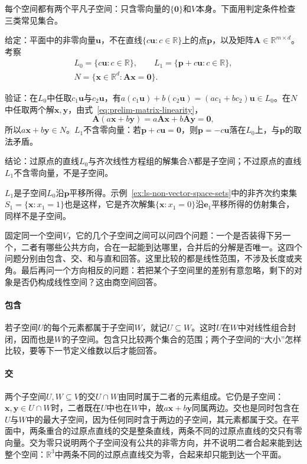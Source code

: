 每个空间都有两个平凡子空间：只含零向量的$\{\bm0\}$和$V$本身。下面用判定条件检查三类常见集合。
\begin{example}
\label{ex:ls-subspace-checks}
给定：平面中的非零向量$\bm u$，不在直线$\{c\bm u:c\in\mathbb R\}$上的点$\bm p$，以及矩阵$\bm A\in\mathbb R^{m\times d}$。考察
\[
 \begin{gathered}
 L_0=\{c\bm u:c\in\mathbb R\},
 \qquad
 L_1=\{\bm p+c\bm u:c\in\mathbb R\},\\
 N=\{\bm x\in\mathbb R^d:\bm A\bm x=\bm0\}.
 \end{gathered}
\]

验证：在$L_0$中任取$c_1\bm u$与$c_2\bm u$，有$a(c_1\bm u)+b(c_2\bm u)=(ac_1+bc_2)\bm u\in L_0$。在$N$中任取两个解$\bm x,\bm y$，由式~\eqref{eq:prelim-matrix-linearity}，
\[
 \bm A(a\bm x+b\bm y)=a\bm A\bm x+b\bm A\bm y=\bm0,
\]
所以$a\bm x+b\bm y\in N$。$L_1$不含零向量：若$\bm p+c\bm u=\bm0$，则$\bm p=-c\bm u$落在$L_0$上，与$\bm p$的取法矛盾。

结论：过原点的直线$L_0$与齐次线性方程组的解集合$N$都是子空间；不过原点的直线$L_1$不含零向量，不是子空间。
\end{example}
$L_1$是子空间$L_0$沿$\bm p$平移所得。示例~\ref{ex:ls-non-vector-space-sets}中的非齐次约束集$S_1=\{\bm x:x_1=1\}$也是这样，它是齐次解集$\{\bm x:x_1=0\}$沿$\bm e_1$平移所得的仿射集合，同样不是子空间。

固定同一个空间$V$，它的几个子空间之间可以问四个问题：一个是否装得下另一个，二者有哪些公共方向，合在一起能到达哪里，合并后的分解是否唯一。这四个问题分别由包含、交、和与直和回答。这里比较的都是线性范围，不涉及长度或夹角。最后再问一个方向相反的问题：若把某个子空间里的差别有意忽略，剩下的对象是否仍构成线性空间？这由商空间回答。

\paragraph{包含}
\label{sec:ls-subspace-inclusion}
若子空间$U$的每个元素都属于子空间$W$，就记$U\subseteq W$。这时$U$在$W$中对线性组合封闭，因而也是$W$的子空间。包含只比较两个集合的范围；两个子空间的“大小”怎样比较，要等下一节定义维数以后才能回答。

\paragraph{交}
\label{sec:ls-intersection}
两个子空间$U,W\subseteq V$的交$U\cap W$由同时属于二者的元素组成。它仍是子空间：$\bm x,\bm y\in U\cap W$时，二者既在$U$中也在$W$中，故$a\bm x+b\bm y$同属两边。交也是同时包含在$U$与$W$中的最大子空间，因为任何同时含于两边的子空间，其元素都属于交。在平面中，两条重合的过原点直线的交是整条直线，两条不同的过原点直线的交只有零向量。交为零只说明两个子空间没有公共的非零方向，并不说明二者合起来能到达整个空间：$\mathbb R^3$中两条不同的过原点直线交为零，合起来却只能到达一个平面。

